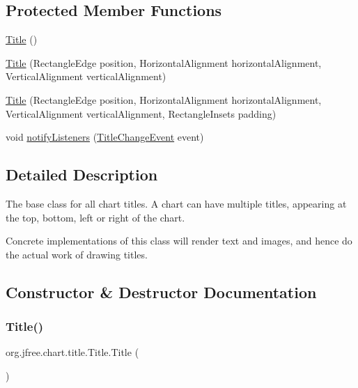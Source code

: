 \subsection*{Protected Member Functions}
\begin{DoxyCompactItemize}
\item 
\mbox{\hyperlink{classorg_1_1jfree_1_1chart_1_1title_1_1_title_a877600feb3b3d96f8c2dbe0ef40b9ac5}{Title}} ()
\item 
\mbox{\hyperlink{classorg_1_1jfree_1_1chart_1_1title_1_1_title_ad36917698b3521349ad28e0b28f94c00}{Title}} (Rectangle\+Edge position, Horizontal\+Alignment horizontal\+Alignment, Vertical\+Alignment vertical\+Alignment)
\item 
\mbox{\hyperlink{classorg_1_1jfree_1_1chart_1_1title_1_1_title_aa4856037c3784fed89840e0644c4c214}{Title}} (Rectangle\+Edge position, Horizontal\+Alignment horizontal\+Alignment, Vertical\+Alignment vertical\+Alignment, Rectangle\+Insets padding)
\item 
void \mbox{\hyperlink{classorg_1_1jfree_1_1chart_1_1title_1_1_title_ae3a002f59bc7104b5847702b6ea1ec7d}{notify\+Listeners}} (\mbox{\hyperlink{classorg_1_1jfree_1_1chart_1_1event_1_1_title_change_event}{Title\+Change\+Event}} event)
\end{DoxyCompactItemize}


\subsection{Detailed Description}
The base class for all chart titles. A chart can have multiple titles, appearing at the top, bottom, left or right of the chart. 

Concrete implementations of this class will render text and images, and hence do the actual work of drawing titles. 

\subsection{Constructor \& Destructor Documentation}
\mbox{\label{classorg_1_1jfree_1_1chart_1_1title_1_1_title_a877600feb3b3d96f8c2dbe0ef40b9ac5}} 
\subsubsection{\texorpdfstring{Title()}{Title()}\hspace{0.1cm}{\footnotesize\ttfamily [1/3]}}
{\footnotesize\ttfamily org.\+jfree.\+chart.\+title.\+Title.\+Title (\begin{DoxyParamCaption}{ }\end{DoxyParamCaption})\hspace{0.3cm}{\ttfamily [protected]}}

